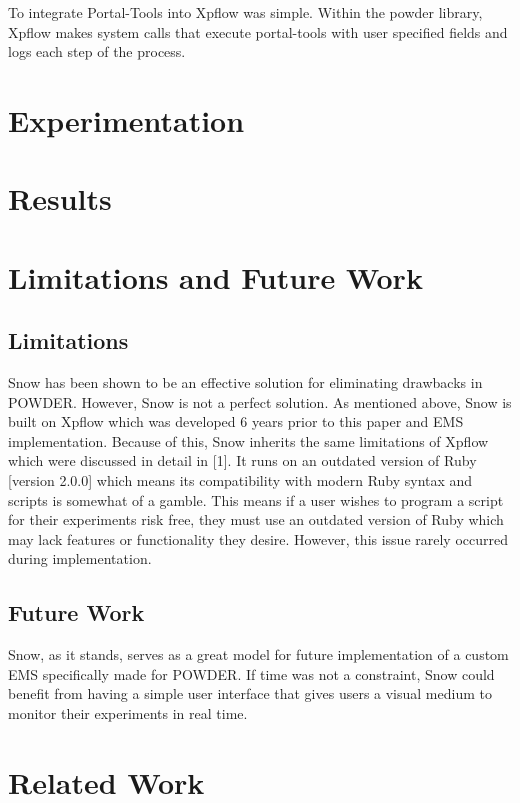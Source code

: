 \documentclass[11pt,twocolumn,letterpaper]{article}
\begin{document}
To integrate Portal-Tools into Xpflow was simple.  Within the powder library, Xpflow makes system calls that execute portal-tools with user specified fields and logs each step of the process.

\section{Experimentation}

\section{Results}

\section{Limitations and Future Work}

\subsection{Limitations}

Snow has been shown to be an effective solution for eliminating drawbacks in POWDER.  However, Snow  is not a perfect solution.  As mentioned above, Snow is built on Xpflow which was developed 6 years prior to this paper and EMS implementation. Because of this, Snow inherits the same limitations of Xpflow which were discussed in detail in [1].  It runs on an outdated version of Ruby [version 2.0.0] which means its compatibility with modern Ruby syntax and scripts is somewhat of a gamble.  This means if a user wishes to program a script for their experiments risk free, they must use an outdated version of Ruby which may lack features or functionality they desire.   However, this issue rarely occurred during implementation.

\subsection{Future Work}

Snow, as it stands, serves as a great model for future implementation of a custom EMS specifically made for POWDER.  If time was not a constraint, Snow could benefit from having a simple user interface that gives users a visual medium to monitor their experiments in real time.

\section{Related Work}
\end{document}
